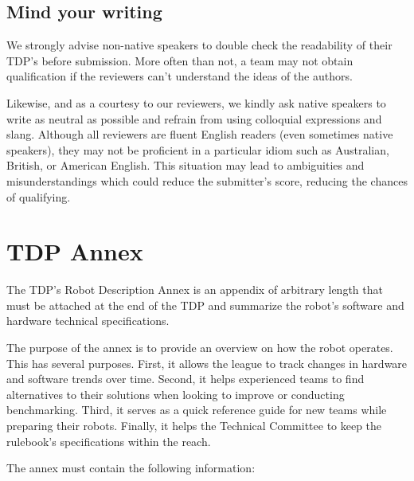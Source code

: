 \documentclass[12pt]{article}
\begin{document}
\subsection{Mind your writing}
We strongly advise non-native speakers to double check the readability of their TDP's before submission.
More often than not, a team may not obtain qualification if the reviewers can't understand the ideas of the authors.

Likewise, and as a courtesy to our reviewers, we kindly ask native speakers to write as neutral as possible and refrain from using colloquial expressions and slang.
Although all reviewers are fluent English readers (even sometimes native speakers), they may not be proficient in a particular idiom such as Australian, British, or American English.
This situation may lead to ambiguities and misunderstandings which could reduce the submitter's score, reducing the chances of qualifying.

\section{TDP Annex}
The TDP's Robot Description Annex is an appendix of arbitrary length that must be attached at the end of the TDP and summarize the robot's software and hardware technical specifications.

The purpose of the annex is to provide an overview on how the robot operates.
This has several purposes.
First, it allows the league to track changes in hardware and software trends over time.
Second, it helps experienced teams to find alternatives to their solutions when looking to improve or conducting benchmarking.
Third, it serves as a quick reference guide for new teams while preparing their robots.
Finally, it helps the Technical Committee to keep the rulebook's specifications within the reach.

The annex must contain the following information:
\end{document}
